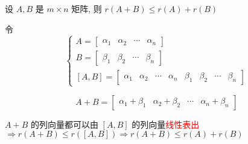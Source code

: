\begin{proposition}
	设 $A,B$ 是 $m\times n$ 矩阵,  则 $r(A + B)\leq r(A) + r(B)$
\end{proposition}
\begin{anymark}[证明]

	令 $$
	\begin{cases}
		A = \begin{bmatrix}
			\alpha_{1} & \alpha_{2} & \cdots & \alpha_{n}
		\end{bmatrix}\\
		B = \begin{bmatrix}
			\beta_{1} & \beta_{2} & \cdots & \beta_{n}
		\end{bmatrix}\\
		[A,B] = \begin{bmatrix}
			\alpha_{1} & \alpha_{2} & \cdots & \alpha_{n} & \beta_{1} & \beta_{2} & \cdots & \beta_{n}
		\end{bmatrix}
	\end{cases}$$

	$$A + B = \begin{bmatrix}
		\alpha_{1}+\beta_{1} & \alpha_{2}+\beta_{2} & \cdots & \alpha_{n}+\beta_{n}
	\end{bmatrix}$$

	$A+B$ 的列向量都可以由 $[A,B]$ 的列向量\textcolor{red}{线性表出} $\Rightarrow r(A+B)\leq r([A,B])\Rightarrow r(A+B)\leq r(A)+r(B)$
\end{anymark}

